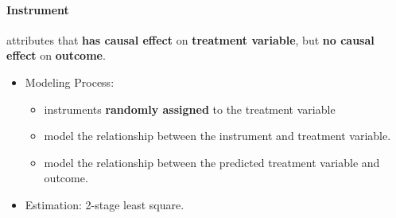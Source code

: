 \paragraph{Instrument} attributes that \textbf{has causal effect} on \textbf{treatment variable}, but \textbf{no causal effect} on \textbf{outcome}.
\begin{itemize}
	\item Modeling Process:
	\begin{itemize}
		\item instruments \textbf{randomly assigned} to the treatment variable
		\item model the relationship between the instrument and treatment variable.
		\item model the relationship between the predicted treatment variable and outcome.
	\end{itemize}
	\item Estimation: 2-stage least square.                                                                                                                                                                                   
\end{itemize}

